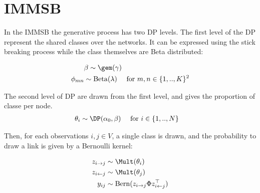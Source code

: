 
\section{IMMSB}

In the IMMSB the generative process has two DP levels. The first level of the DP represent the shared classes over the networks. It can be expressed using the stick breaking process while the class themselves are Beta distributed:

\begin{align}
    &\mathbf{\beta} \sim \gem(\gamma)  \\
    \phi_{mn} &\sim \mathrm{Beta}(\lambda) \quad\text{ for }  m,n \in \{1, .., K\}^2
\end{align}

The second level of DP are drawn from the first level, and gives the proportion of classe per node.
\begin{align}
    \theta_i &\sim \DP(\alpha_0, \beta) \quad\text{ for }  i \in \{1, .., N\}
\end{align}

Then, for each observations $i, j \in V$, a single class is drawn, and the probability to draw a link is given by a Bernoulli kernel:

\begin{align}
    z_{i\rightarrow j} &\sim \Mult(\theta_i) \\
    z_{i\leftarrow j} &\sim \Mult(\theta_j) \\
    y_{ij} &\sim \mathrm{Bern}(z_{i\rightarrow j} \Phi z_{i\leftarrow j}^\top)
\end{align}

